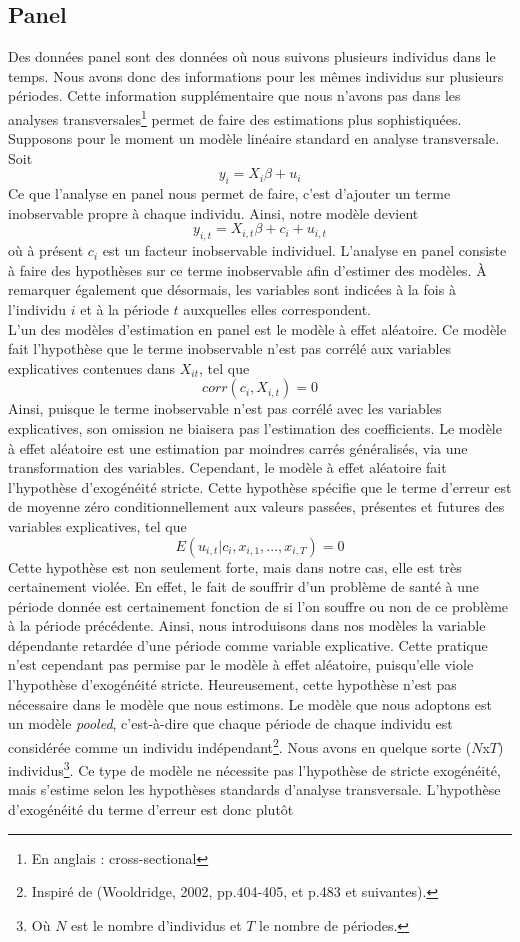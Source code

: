 \documentclass[a4paper, oneside, titlepage]{article}
\begin{document}
\subsection{Panel}
Des données panel sont des données où nous suivons plusieurs individus dans le temps. Nous avons donc des informations pour les mêmes individus sur plusieurs périodes. Cette information supplémentaire que nous n'avons pas dans les analyses transversales\footnote{En anglais : cross-sectional} permet de faire des estimations plus sophistiquées. Supposons pour le moment un modèle linéaire standard en analyse transversale. Soit
\[y_i=X_i\beta+u_i\]
Ce que l'analyse en panel nous permet de faire, c'est d'ajouter un terme inobservable propre à chaque individu. Ainsi, notre modèle devient
\[y_{i,t}=X_{i,t}\beta+c_i+u_{i,t}\]
où à présent $c_i$ est un facteur inobservable individuel. L'analyse en panel consiste à faire des hypothèses sur ce terme inobservable afin d'estimer des modèles. À remarquer également que désormais, les variables sont indicées à la fois à l'individu $i$ et à la période $t$ auxquelles elles correspondent. 
\\
L'un des modèles d'estimation en panel est le modèle à effet aléatoire. Ce modèle fait l'hypothèse que le terme inobservable n'est pas corrélé aux variables explicatives contenues dans $X_{it}$, tel que
\[corr(c_i,X_{i,t})=0\]
Ainsi, puisque le terme inobservable n'est pas corrélé avec les variables explicatives, son omission ne biaisera pas l'estimation des coefficients. Le modèle à effet aléatoire est une estimation par moindres carrés généralisés, via une transformation des variables. Cependant, le modèle à effet aléatoire fait l'hypothèse d'exogénéité stricte. Cette hypothèse spécifie que le terme d'erreur est de moyenne zéro conditionnellement aux valeurs passées, présentes et futures des variables explicatives, tel que
\[E(u_{i,t}|c_i, x_{i,1},...,x_{i,T})=0\]
Cette hypothèse est non seulement forte, mais dans notre cas, elle est très certainement violée. En effet, le fait de souffrir d'un problème de santé à une période donnée est certainement fonction de si l'on souffre ou non de ce problème à la période précédente. Ainsi, nous introduisons dans nos modèles la variable dépendante retardée d'une période comme variable explicative. Cette pratique n'est cependant pas permise par le modèle à effet aléatoire, puisqu'elle viole l'hypothèse d'exogénéité stricte. Heureusement, cette hypothèse n'est pas nécessaire dans le modèle que nous estimons. Le modèle que nous adoptons est un modèle \textit{pooled}, c'est-à-dire que chaque période de chaque individu est considérée comme un individu indépendant\footnote{Inspiré de (Wooldridge, 2002, pp.404-405, et p.483 et suivantes).}. Nous avons en quelque sorte ($N$x$T$) individus\footnote{Où $N$ est le nombre d'individus et $T$ le nombre de périodes.}. Ce type de modèle ne nécessite pas l'hypothèse de stricte exogénéité, mais s'estime selon les hypothèses standards d'analyse transversale. L'hypothèse d'exogénéité du terme d'erreur est donc plutôt
\end{document}

